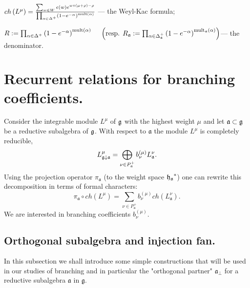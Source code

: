 \documentclass[12pt]{iopart}
\theoremstyle{definition}
\newcommand{\gf}{\mathfrak{g}}
\newcommand{\af}{\mathfrak{a}}
\newcommand{\afb}{\mathfrak{a}_{\bot}}
\begin{document}
$ch\left( L^{\mu }\right) =\frac{\sum_{w\in W}\epsilon (w)e^{w\circ (\mu
+\rho )-\rho }}{\prod_{\alpha \in \Delta ^{+}}\left( 1-e^{-\alpha }\right) ^{%
\mathrm{{mult}\left( \alpha \right) }}}$ --- the Weyl-Kac formula;

$R:=\prod_{\alpha \in \Delta ^{+}}\left( 1-e^{-\alpha }\right) ^{\mathrm{{%
mult}\left( \alpha \right) }}\quad $
$\left( \mbox{resp. }R_{\af}:=\prod_{\alpha \in \Delta _{%
\af}^{+}}\left( 1-e^{-\alpha }\right) ^{\mathrm{mult}_{\af}\mathrm{%
\left( \alpha \right) }}\right) $--- the
denominator.



\section{Recurrent relations for branching coefficients.}
\label{sec:recurr-form-branch}

Consider the integrable module $L^{\mu }$
of $\frak{g}$ with the highest weight $\mu $ and
let $\af\subset \frak{g}$ be a reductive subalgebra of $\frak{g}$.
With respect to $\af$ the module $L^{\mu }$ is completely reducible,
\begin{equation*}
 L_{\frak{g}\downarrow \af}^{\mu }=\bigoplus
\limits_{\nu \in P_{\af}^{+}}b_{\nu }^{\left( \mu \right) }L_{\af}^{\nu }.
\end{equation*}
Using the projection operator $\pi_{\af}$ (to the weight space $\frak{h_a}^*$)
one can  rewrite this decomposition in terms of formal characters:
\begin{equation}
\label{branching1}
 \pi _{\af}\circ ch\left( L^{\mu }\right)
 =\sum_{\nu \in P_{\af}^{+}}b_{\nu }^{(\mu)}ch\left( L_{\af}^{\nu }\right) .
\end{equation}
We are interested in branching coefficients $b^{(\mu)}_{\nu}$.

\subsection{Orthogonal subalgebra and injection fan.}
\label{subsec:branching-orthog-pair}

In this subsection we shall introduce some simple constructions that will be used
in our studies of branching and in particular the "orthogonal partner" $\afb$ for a
reductive subalgebra $\af$  in  $\gf$.
\end{document}
